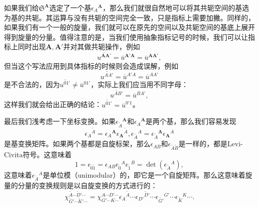 如果我们给$\mathfrak{S}^{\boldsymbol{A}}$选定了一个基$\epsilon {_{A}}^{\boldsymbol{A}}$，那么我们就很自然地可以将其共轭空间的基选为基的共轭。其运算与没有共轭的空间完全一致，只是指标上需要加撇。同样的，如果我们有一个一般的旋量，我们就可以在原先的空间以及共轭空间的基底上展开得到旋量的分量。值得注意的是，当我们使用抽象指标记号的时候，我们可以让指标上同时出现$\boldsymbol{A} ,\boldsymbol{A} '$并对其做共轭操作，例如
\begin{equation*}
	\overline{u^{\boldsymbol{AA} '}} =\overline{u}^{\boldsymbol{A} '\boldsymbol{A}} =\overline{u}^{\boldsymbol{AA} '} ,
\end{equation*}
但当这个写法应用到具体指标的时候则会造成误解，例如
\begin{equation*}
	\overline{u^{AA'}} =\overline{u}^{A'A} =\overline{u}^{AA'}
\end{equation*}
是不合法的，因为$\overline{u^{01'}} \neq \overline{u}^{01'}$，实际上我们应当用不同字母：
\begin{equation*}
	\overline{u^{AB'}} =\overline{u}^{BA'} ,
\end{equation*}
这样我们就会给出正确的结论：$\overline{u^{01'}} =\overline{u}^{0'1}$。

最后我们浅考虑一下坐标变换。如果$\epsilon {_{\tilde{A}}}^{\boldsymbol{A}}$和$\epsilon {_{A}}^{\boldsymbol{A}}$是两个基，那么我们容易发现
\begin{equation*}
	\epsilon {_{A}}^{\tilde{A}} =\epsilon {_{A}}^{\boldsymbol{A}} \epsilon {_{\boldsymbol{A}}}^{\tilde{A}} ,\epsilon {_{\tilde{A}}}^{A} =\epsilon {_{\tilde{A}}}^{\boldsymbol{A}} \epsilon {_{\boldsymbol{A}}}^{A}
\end{equation*}
是基变换矩阵。如果两个基都是自旋标架，那么$\epsilon _{AB}$和$\epsilon _{\tilde{A}\tilde{B}}$是一样的，都是Levi-Civita符号。这意味着
\begin{equation*}
	1=\epsilon _{\tilde{0}\tilde{1}} =\epsilon _{AB} \epsilon {_{\tilde{0}}}^{A} \epsilon {_{\tilde{1}}}^{B} =\det (\epsilon {_{\tilde{A}}}^{A} ),
\end{equation*}
这意味着$\epsilon {_{\tilde{A}}}^{A}$是单位模（unimodular）的，即它是一个自旋矩阵。那么这意味着旋量的分量的变换规则是以自旋变换的方式进行的：
\begin{equation*}
	\chi _{\tilde{G} '\cdots \tilde{K} '\cdots }^{\tilde{A} \cdots \tilde{D} '\cdots } =\chi _{G'\cdots K\cdots }^{A\cdots D'\cdots } \epsilon {_{A}}^{\tilde{A}} \cdots \epsilon {_{D'}}^{\tilde{D} '} \cdots \epsilon {_{\tilde{G'}}}^{G'} \cdots \epsilon {_{\tilde{K}}}^{K} \cdots .
\end{equation*}